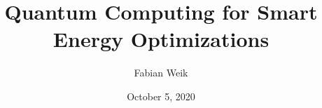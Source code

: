 \documentclass{article}
\author{Fabian Weik}
\date{October 5, 2020}
\title{Quantum Computing for Smart Energy Optimizations}
\begin{document}
  \maketitle

  
  
  

  \begin{appendices}
    
  \end{appendices}


  
  
\end{document}
